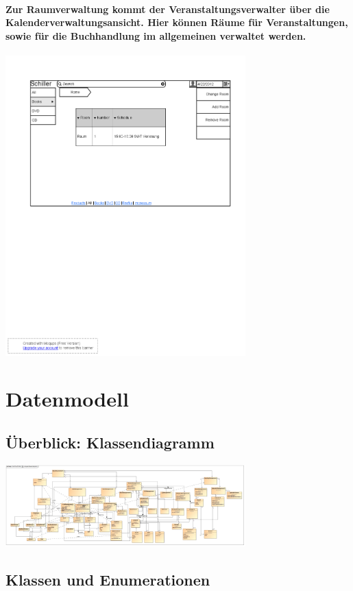 \documentclass[a4paper]{article}
\begin{document}
\paragraph{Zur Raumverwaltung kommt der Veranstaltungsverwalter über die Kalenderverwaltungsansicht. Hier können Räume für Veranstaltungen, sowie für die Buchhandlung im allgemeinen verwaltet werden.\\}
\includegraphics[width=350px]{19ChangeRoom.png}


\section{Datenmodell}

\subsection{Überblick: Klassendiagramm}

\includegraphics[width=350px]{analyse-klassendiagramm.jpg}

\subsection{Klassen und Enumerationen}
\end{document}
